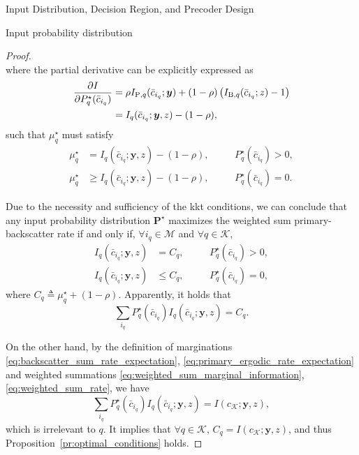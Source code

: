 \documentclass[journal]{IEEEtran}
\begin{document}
\begin{section}{Input Distribution, Decision Region, and Precoder Design}
\begin{subsection}{Input probability distribution}
\begin{proof}
\begin{subequations}
				\end{subequations}
				where the partial derivative can be explicitly expressed as
				\begin{subequations}
					\begin{align}
						\pdv{I}{P_q^{\star}(\bar{c}_{i_q})}
						& = \rho I_{\mathrm{P},q}(\bar{c}_{i_q};\boldsymbol{y}) + (1 - \rho) \left( I_{\mathrm{B},q}(\bar{c}_{i_q};z) - 1 \right)\\
						& = I_q(\bar{c}_{i_q};\boldsymbol{y},z) - (1 - \rho),
					\end{align}
				\end{subequations}
				such that $\mu_q^{\star}$ must satisfy
				\begin{subequations}
					\begin{alignat}{2}
						\mu_q^{\star} & = I_q(\bar{c}_{i_q};\boldsymbol{y},z) - (1 - \rho), \quad && P_q^{\star}(\bar{c}_{i_q}) > 0,\\
						\mu_q^{\star} & \ge I_q(\bar{c}_{i_q};\boldsymbol{y},z) - (1 - \rho), \quad && P_q^{\star}(\bar{c}_{i_q}) = 0.
					\end{alignat}
				\end{subequations}

				Due to the necessity and sufficiency of the \gls{kkt} conditions, we can conclude that any input probability distribution $\boldsymbol{P}^{\star}$ maximizes the weighted sum primary-backscatter rate if and only if, $\forall i_q \in \mathcal{M}$ and $\forall q \in \mathcal{K}$,
				\begin{subequations}
					\begin{alignat}{2}
						I_q(\bar{c}_{i_q};\boldsymbol{y},z) & = C_q, \quad && P_q^{\star}(\bar{c}_{i_q}) > 0,\\
						I_q(\bar{c}_{i_q};\boldsymbol{y},z) & \le C_q, \quad && P_q^{\star}(\bar{c}_{i_q}) = 0,
					\end{alignat}
				\end{subequations}
				where $C_q \triangleq \mu_q^{\star} + (1 - \rho)$. Apparently, it holds that
				\begin{equation}
					\sum_{i_q} P_q^{\star}(\bar{c}_{i_q}) I_q(\bar{c}_{i_q};\boldsymbol{y},z) = C_q.
				\end{equation}

				On the other hand, by the definition of marginations \eqref{eq:backscatter_sum_rate_expectation}, \eqref{eq:primary_ergodic_rate_expectation} and weighted summations \eqref{eq:weighted_sum_marginal_information}, \eqref{eq:weighted_sum_rate}, we have
				\begin{equation}
					\sum_{i_q} P_q^{\star}(\bar{c}_{i_q}) I_q(\bar{c}_{i_q};\boldsymbol{y},z) = I(c_{\mathcal{K}};\boldsymbol{y},z),
				\end{equation}
				which is irrelevant to $q$. It implies that $\forall q \in \mathcal{K}$, $C_q = I(c_{\mathcal{K}};\boldsymbol{y},z)$, and thus Proposition~\eqref{pr:optimal_conditions} holds.
			\end{proof}


\end{subsection}
\end{section}
\end{document}
